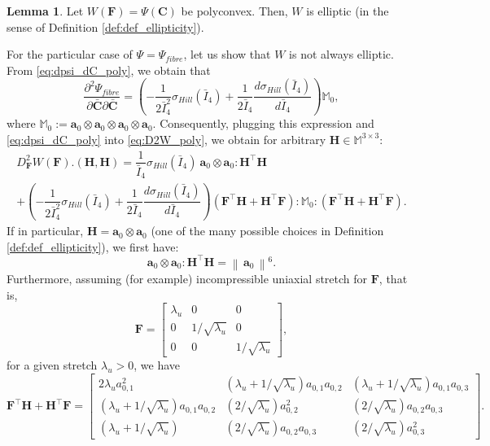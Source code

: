 \documentclass{sfuthesis}
\numberwithin{equation}{section}
\numberwithin{figure}{chapter}
\numberwithin{table}{chapter}
\theoremstyle{definition}
\newtheorem{lemma}[definition]{Lemma}
\def\*#1{{\mathbf{#1}}} %
\newcommand{\I}{{\bar{I}}}
\newcommand{\norm}[1]{{\left\| \, #1 \, \right\|}}
\begin{document}
\begin{lemma} \label{le:poly_elliptic}
    Let $W(\*F) = \Psi(\*C)$ be polyconvex. Then, $W$ is elliptic (in the sense of Definition \ref{def:def_ellipticity}).
\end{lemma}

For the particular case of $\Psi = \Psi_{fibre}$, let us show that $W$ is not always elliptic. From \eqref{eq:dpsi_dC_poly}, we obtain that
\begin{equation}
    \dfrac{\partial^2 \Psi_{fibre}}{\partial \bar{\*C} \partial \bar{\*C}} = \left( - \dfrac{1}{2\I_4^2} \sigma_{Hill}(\I_4) + \dfrac{1}{2\I_4} \dfrac{d \sigma_{Hill}(\I_4)}{d\I_4} \right) \mathbb{M}_0,
\end{equation}
where $\mathbb{M}_0 := \*a_0 \otimes \*a_0 \otimes \*a_0 \otimes \*a_0$. Consequently, plugging this expression and \eqref{eq:dpsi_dC_poly} into \eqref{eq:D2W_poly}, we obtain for arbitrary $\*H \in \mathbb{M}^{3\times3}$:
\begin{multline} \label{eq:D2F_FH}
    D_{\*F}^2 W(\*F).(\*H, \*H) = \dfrac{1}{\I_4} \sigma_{Hill}(\I_4) \ \*a_0 \otimes \*a_0 : \*H^\top \*H \\
    + \left( - \dfrac{1}{2\I_4^2} \sigma_{Hill}(\I_4) + \dfrac{1}{2\I_4} \dfrac{d \sigma_{Hill}(\I_4)}{d\I_4} \right) (\*F^\top \*H + \*H^\top \*F) : \mathbb{M}_0 : (\*F^\top \*H + \*H^\top \*F).
\end{multline}
If in particular, $\*H = \*a_0 \otimes \*a_0$ (one of the many possible choices in Definition \ref{def:def_ellipticity}), we first have:
\begin{equation}
    \*a_0 \otimes \*a_0 : \*H^\top \*H = \norm{\*a_0}^6.
\end{equation}
Furthermore, assuming (for example) incompressible uniaxial stretch for $\*F$, that is,
\begin{equation} \label{eq:uniaxial_stretch_F}
    \*F = \begin{bmatrix}
    \lambda_u & 0 & 0 \\
    0 & 1/\sqrt{\lambda_u} & 0 \\
    0 & 0 & 1/\sqrt{\lambda_u}
    \end{bmatrix},
\end{equation}
for a given stretch $\lambda_u > 0$, we have
\begin{equation}
    \*F^\top \*H + \*H^\top \*F = \begin{bmatrix}
        2\lambda_u a_{0,1}^2 & \left( \lambda_u + 1/\sqrt{\lambda_u} \right) a_{0,1} a_{0,2} &  \left( \lambda_u + 1/\sqrt{\lambda_u} \right) a_{0,1} a_{0,3} \\
         \left( \lambda_u + 1/\sqrt{\lambda_u} \right) a_{0,1} a_{0,2} & (2/\sqrt{\lambda_u}) a_{0,2}^2 & (2/\sqrt{\lambda_u}) a_{0,2} a_{0,3}\\
          \left( \lambda_u + 1/\sqrt{\lambda_u} \right) & (2/\sqrt{\lambda_u}) a_{0,2} a_{0,3} & (2/\sqrt{\lambda_u}) a_{0,3}^2
    \end{bmatrix}.
\end{equation}
\end{document}
